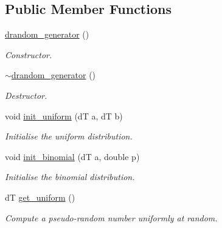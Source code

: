 \subsection*{Public Member Functions}
\begin{DoxyCompactItemize}
\item 
\mbox{\label{classlgraph_1_1utils_1_1drandom__generator_a3029c9cb8b6e73b0e0f0ca5fbc33c6ea}} 
\hyperlink{classlgraph_1_1utils_1_1drandom__generator_a3029c9cb8b6e73b0e0f0ca5fbc33c6ea}{drandom\+\_\+generator} ()
\begin{DoxyCompactList}\small\item\em Constructor. \end{DoxyCompactList}\item 
\mbox{\label{classlgraph_1_1utils_1_1drandom__generator_a09711a23359454bf60cefb2e0be64a0a}} 
\hyperlink{classlgraph_1_1utils_1_1drandom__generator_a09711a23359454bf60cefb2e0be64a0a}{$\sim$drandom\+\_\+generator} ()
\begin{DoxyCompactList}\small\item\em Destructor. \end{DoxyCompactList}\item 
void \hyperlink{classlgraph_1_1utils_1_1drandom__generator_a38c5b5c981d635aac32f632a0f4a0092}{init\+\_\+uniform} (dT a, dT b)
\begin{DoxyCompactList}\small\item\em Initialise the uniform distribution. \end{DoxyCompactList}\item 
void \hyperlink{classlgraph_1_1utils_1_1drandom__generator_acae17810176a40fdfd8a4a260892361e}{init\+\_\+binomial} (dT a, double p)
\begin{DoxyCompactList}\small\item\em Initialise the binomial distribution. \end{DoxyCompactList}\item 
\mbox{\label{classlgraph_1_1utils_1_1drandom__generator_a7735e31610688246957518795169bae3}} 
dT \hyperlink{classlgraph_1_1utils_1_1drandom__generator_a7735e31610688246957518795169bae3}{get\+\_\+uniform} ()
\begin{DoxyCompactList}\small\item\em Compute a pseudo-\/random number uniformly at random. \end{DoxyCompactList}\item 

\end{DoxyCompactItemize}
